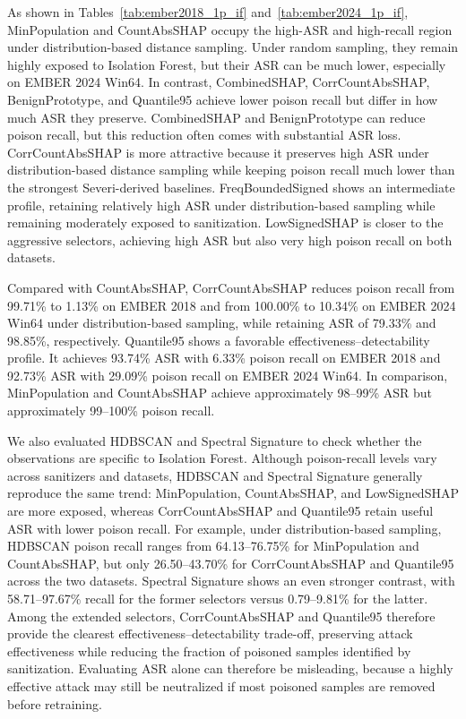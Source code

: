 

As shown in Tables~\ref{tab:ember2018_1p_if} and~\ref{tab:ember2024_1p_if}, MinPopulation and CountAbsSHAP occupy the high-ASR and high-recall region under distribution-based distance sampling.
Under random sampling, they remain highly exposed to Isolation Forest, but their ASR can be much lower, especially on EMBER 2024 Win64.
In contrast, CombinedSHAP, CorrCountAbsSHAP, BenignPrototype, and Quantile95 achieve lower poison recall but differ in how much ASR they preserve.
CombinedSHAP and BenignPrototype can reduce poison recall, but this reduction often comes with substantial ASR loss.
CorrCountAbsSHAP is more attractive because it preserves high ASR under distribution-based distance sampling while keeping poison recall much lower than the strongest Severi-derived baselines.
FreqBoundedSigned shows an intermediate profile, retaining relatively high ASR under distribution-based sampling while remaining moderately exposed to sanitization.
LowSignedSHAP is closer to the aggressive selectors, achieving high ASR but also very high poison recall on both datasets.

Compared with CountAbsSHAP, CorrCountAbsSHAP reduces poison recall from 99.71\% to 1.13\% on EMBER 2018 and from 100.00\% to 10.34\% on EMBER 2024 Win64 under distribution-based sampling, while retaining ASR of 79.33\% and 98.85\%, respectively.
Quantile95 shows a favorable effectiveness–detectability profile.
It achieves 93.74\% ASR with 6.33\% poison recall on EMBER 2018 and 92.73\% ASR with 29.09\% poison recall on EMBER 2024 Win64. In comparison, MinPopulation and CountAbsSHAP achieve approximately 98–99\% ASR but approximately 99–100\% poison recall.

We also evaluated HDBSCAN and Spectral Signature to check whether the observations are specific to Isolation Forest.
Although poison-recall levels vary across sanitizers and datasets, HDBSCAN and Spectral Signature generally reproduce the same trend: MinPopulation, CountAbsSHAP, and LowSignedSHAP are more exposed, whereas CorrCountAbsSHAP and Quantile95 retain useful ASR with lower poison recall.
For example, under distribution-based sampling, HDBSCAN poison recall ranges from 64.13--76.75\% for MinPopulation and CountAbsSHAP, but only 26.50--43.70\% for CorrCountAbsSHAP and Quantile95 across the two datasets.
Spectral Signature shows an even stronger contrast, with 58.71--97.67\% recall for the former selectors versus 0.79--9.81\% for the latter.
Among the extended selectors, CorrCountAbsSHAP and Quantile95 therefore provide the clearest effectiveness--detectability trade-off, preserving attack effectiveness while reducing the fraction of poisoned samples identified by sanitization.
Evaluating ASR alone can therefore be misleading, because a highly effective attack may still be neutralized if most poisoned samples are removed before retraining.

